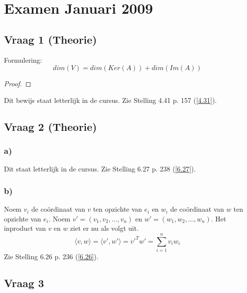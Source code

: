 \documentclass[lineaire_algebra_oplossingen.tex]{subfiles}
\begin{document}
\section{Examen Januari 2009}
\subsection{Vraag 1 (Theorie)}
Formulering:
\[
dim(V) = dim(Ker(A)) + dim(Im(A))
\]
\begin{proof}
\end{proof}
Dit bewijs staat letterlijk in de cursus. Zie Stelling 4.41 p. 157 (\ref{4.31}).

\subsection{Vraag 2 (Theorie)}
\subsubsection*{a)}
Dit staat letterlijk in de cursus. Zie Stelling 6.27 p. 238 (\ref{6.27}).

\subsubsection*{b)}
Noem $v_i$ de co\"ordinaat van $v$ ten opzichte van $e_i$ en $w_i$ de co\"ordinaat van $w$ ten opzichte van $e_i$. Noem $v' = (v_1,v_2,...,v_n)$ en $w' = (w_1,w_2,...,w_n)$. Het inproduct van $v$ en $w$ ziet er nu als volgt uit.
\[
\langle v,w \rangle = \langle v',w' \rangle = v'^Tw' = \sum_{i=1}^nv_iw_i
\]
Zie Stelling 6.26 p. 236 (\ref{6.26}).

\subsection{Vraag 3}
\end{document}
